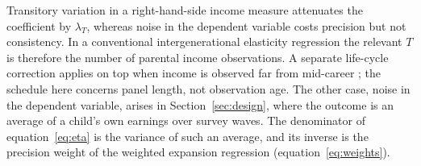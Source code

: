 \documentclass[11pt]{article}
\begin{document}
Transitory variation in a right-hand-side income measure attenuates the
coefficient by $\lambda_T$, whereas noise in the dependent variable costs
precision but not consistency. In a conventional intergenerational
elasticity regression the relevant $T$ is therefore the number of
parental income observations. A separate life-cycle correction applies
on top when income is observed far from mid-career
\citep{HaiderSolon2006}; the schedule here concerns panel length, not
observation age. The other case, noise in the dependent variable, arises in Section~\ref{sec:design}, where the outcome is an average of a child's own earnings over survey waves. The denominator of equation~\eqref{eq:eta} is the variance of such an average, and its inverse is the precision weight of the weighted expansion regression (equation~\eqref{eq:weights}).
\end{document}
